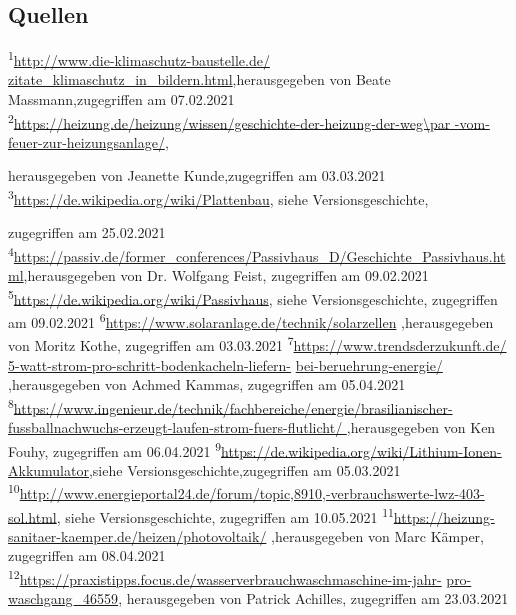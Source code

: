 \begin{thebibliography}{tiefe}
\setcounter{subsection}{1}
\subsection{Quellen}

 \textsuperscript{1}\url{http://www.die-klimaschutz-baustelle.de/
zitate_klimaschutz_in_bildern.html},herausgegeben von Beate Massmann,zugegriffen am
07.02.2021
 \textsuperscript{2}\url{https://heizung.de/heizung/wissen/geschichte-der-heizung-der-weg\par -vom-feuer-zur-heizungsanlage/},\par herausgegeben von Jeanette Kunde,zugegriffen am 03.03.2021
 \textsuperscript{3}\url{https://de.wikipedia.org/wiki/Plattenbau}, siehe Versionsgeschichte,\par zugegriffen am 25.02.2021
 \textsuperscript{4}\url{https://passiv.de/former_conferences/Passivhaus_D/Geschichte_Passivhaus.html},herausgegeben von Dr. Wolfgang Feist, zugegriffen am 09.02.2021
 \textsuperscript{5}\url{https://de.wikipedia.org/wiki/Passivhaus}, siehe Versionsgeschichte, zugegriffen am 09.02.2021
 \textsuperscript{6}\url {https://www.solaranlage.de/technik/solarzellen} ,herausgegeben
von Moritz Kothe, zugegriffen am 03.03.2021
 \textsuperscript{7}\url {https://www.trendsderzukunft.de/
5-watt-strom-pro-schritt-bodenkacheln-liefern-}
\url{bei-beruehrung-energie/} ,herausgegeben
von Achmed Kammas, zugegriffen am 05.04.2021
 \textsuperscript{8}\url {https://www.ingenieur.de/technik/fachbereiche/energie/brasilianischer-fussballnachwuchs-erzeugt-laufen-strom-fuers-flutlicht/
} ,herausgegeben
von Ken Fouhy, zugegriffen am 06.04.2021
 \textsuperscript{9}\url{https://de.wikipedia.org/wiki/Lithium-Ionen-Akkumulator},siehe Versionsgeschichte,zugegriffen am 05.03.2021
 \textsuperscript{10}\url{http://www.energieportal24.de/forum/topic,8910,-verbrauchswerte-lwz-403-sol.html}, siehe Versionsgeschichte, zugegriffen am 10.05.2021
 \textsuperscript{11}\url {https://heizung-sanitaer-kaemper.de/heizen/photovoltaik/} ,herausgegeben von Marc Kämper, zugegriffen am 08.04.2021
 \textsuperscript{12}\url{https://praxistipps.focus.de/wasserverbrauchwaschmaschine-im-jahr-}
\url{pro-waschgang_46559}, herausgegeben von Patrick Achilles, zugegriffen am 23.03.2021

\end{thebibliography}
